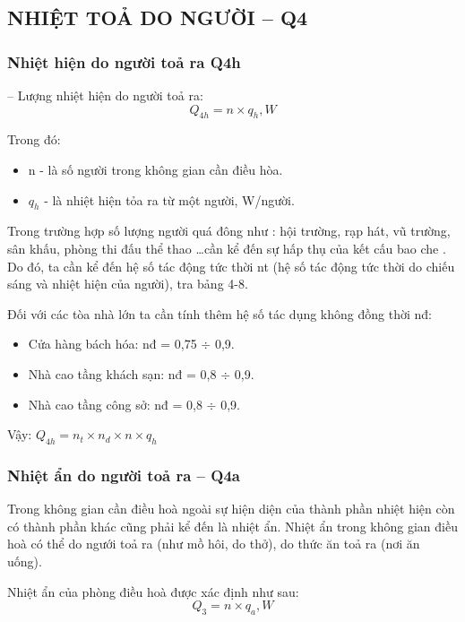 \subsection{NHIỆT TOẢ DO NGƯỜI -- Q{\scriptsize 4} }
\subsubsection{Nhiệt hiện do người toả ra Q{\scriptsize 4h}}
-- Lượng nhiệt hiện do người toả ra:
\begin{equation*}
	Q_{4h} = n\times q_{h}, W
\end{equation*}

Trong đó:
\begin{itemize}
	\item n - là số người trong không gian cần điều hòa.
	\item $q_{h}$ - là nhiệt hiện tỏa ra từ một người, W/người.
\end{itemize}

Trong trường hợp số lượng người quá đông như : hội trường, rạp hát, vũ trường, sân khấu, phòng thi đấu thể thao …cần kể đến sự hấp thụ của kết cấu bao che . Do đó, ta cần kể đến hệ số tác động tức thời nt (hệ số tác động tức thời do chiếu sáng và nhiệt hiện của người), tra bảng 4-8.

Đối với các tòa nhà lớn ta cần tính thêm hệ số tác dụng không đồng thời n{\scriptsize đ}:
\begin{itemize}[label={-}]
	\item Cửa hàng bách hóa: n{\scriptsize đ} = 0,75 $ \div $ 0,9.
	\item Nhà cao tầng khách sạn: n{\scriptsize đ} = 0,8 $ \div $ 0,9.
	\item Nhà cao tầng công sở: n{\scriptsize đ} = 0,8 $ \div $ 0,9.
\end{itemize}

Vậy: $Q_{4h} = n_{t}\times n_{d}\times n\times q_{h}$

\subsubsection{Nhiệt ẩn do người toả ra -- Q{\scriptsize 4a}}
Trong không gian cần điều hoà ngoài sự hiện diện của thành phần nhiệt hiện còn có thành phần khác cũng phải kể đến là nhiệt ẩn. Nhiệt ẩn trong không gian điều hoà có thể do ngưới toả ra (như mồ hôi, do thở), do thức ăn toả ra (nơi ăn uống).

Nhiệt ẩn của phòng điều hoà được xác định như sau:
\begin{equation*}
	Q_{3} = n\times q_{a}, W
\end{equation*}

